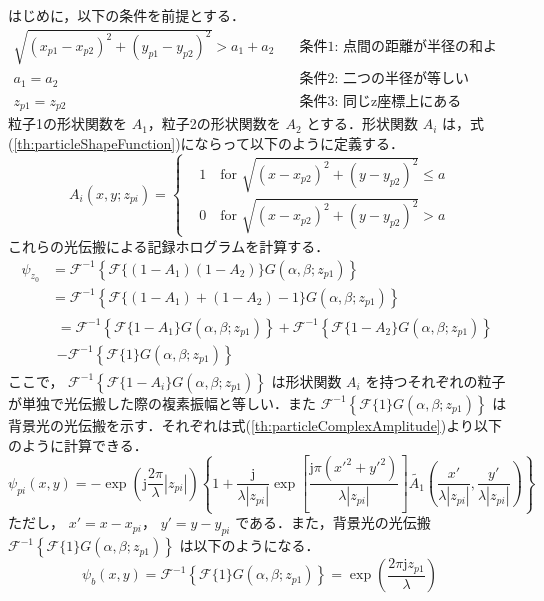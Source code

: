 はじめに，以下の条件を前提とする．
\begin{align}
    \sqrt{(x_{p1}-x_{p2})^2+(y_{p1}-y_{p2})^2} > a_1+a_2  \quad &\text{条件1: 点間の距離が半径の和より大きい} \\
    a_1 = a_2 \quad &\text{条件2: 二つの半径が等しい} \\
    z_{p1} = z_{p2} \quad &\text{条件3: 同じz座標上にある}
\end{align}
粒子1の形状関数を $A_1$，粒子2の形状関数を $A_2$ とする．形状関数 $A_i$ は，式(\ref{th:particleShapeFunction})にならって以下のように定義する．
\begin{equation}
    \label{th:eachParticleShapeFunction}
    A_i(x,y;z_{pi}) = \left\{
    \begin{aligned}
        &1 \quad \text{for } \sqrt{(x-x_{p2})^2+(y-y_{p2})^2} \leq a \\
        &0 \quad \text{for } \sqrt{(x-x_{p2})^2+(y-y_{p2})^2} > a
    \end{aligned}
    \right.
\end{equation}
これらの光伝搬による記録ホログラムを計算する．
\begin{align}
    \psi_{z_0} &= \mathcal{F}^{-1}\left\{ \mathcal{F}\{(1-A_1)(1-A_2)\}G(\alpha,\beta;z_{p1}) \right\} \\
    &= \mathcal{F}^{-1}\left\{ \mathcal{F}\{(1-A_1)+(1-A_2)-1\}G(\alpha,\beta;z_{p1}) \right\} \\
    & \begin{multlined} = \mathcal{F}^{-1}\left\{ \mathcal{F}\{1-A_1\}G(\alpha,\beta;z_{p1}) \right\} + \mathcal{F}^{-1}\left\{ \mathcal{F}\{1-A_2\}G(\alpha,\beta;z_{p1}) \right\} \\ - \mathcal{F}^{-1}\left\{ \mathcal{F}\{1\}G(\alpha,\beta;z_{p1}) \right\} \end{multlined}
\end{align}
ここで， $\mathcal{F}^{-1}\left\{ \mathcal{F}\{1-A_i\}G(\alpha,\beta;z_{p1}) \right\}$ は形状関数 $A_i$ を持つそれぞれの粒子が単独で光伝搬した際の複素振幅と等しい．また  $\mathcal{F}^{-1}\left\{ \mathcal{F}\{1\}G(\alpha,\beta;z_{p1}) \right\}$ は背景光の光伝搬を示す．それぞれは式(\ref{th:particleComplexAmplitude})より以下のように計算できる．
\begin{equation}
    \label{th:vikramEq4.8}
    \psi_{pi}(x,y) = -\exp{\left(\mathrm{j}\frac{2\pi}{\lambda}|z_{pi}|\right)} \left\{ 1 + \frac{\mathrm{j}}{\lambda |z_{pi}|} \exp{ \left[ \frac{\mathrm{j} \pi \left( x'^2 + y'^2 \right)}{\lambda |z_{pi}|} \right]} \tilde{A_1} \left(\frac{x'}{\lambda |z_{pi}|},\frac{y'}{\lambda |z_{pi}|} \right)  \right\}
\end{equation}
ただし， $x' = x- x_{pi}$， $y' = y-y_{pi}$ である．また，背景光の光伝搬 $\mathcal{F}^{-1}\left\{ \mathcal{F}\{1\}G(\alpha,\beta;z_{p1}) \right\}$ は以下のようになる．
\begin{equation}
    \psi_b(x,y) = \mathcal{F}^{-1}\left\{ \mathcal{F}\{1\}G(\alpha,\beta;z_{p1}) \right\} = \exp{\left(\frac{2\pi \mathrm{j}z_{p1}}{\lambda}\right)}
\end{equation}

